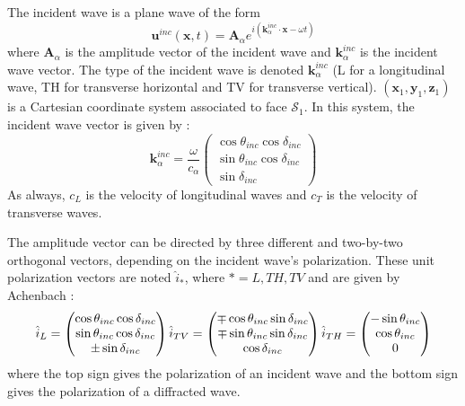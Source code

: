 The incident wave is a plane wave of the form
\begin{equation}
\mathbf{u}^{inc}(\mathbf{x},t)=\mathbf{A}_{\alpha}e^{i(\mathbf{k}_{\alpha}^{inc}\cdot \mathbf{x}-\omega t)}
\end{equation}
where $\mathbf{A}_{\alpha}$ is the amplitude vector of the incident wave and $\mathbf{k}_{\alpha}^{inc}$ is the incident wave vector. The type of the incident wave is denoted $\mathbf{k}_{\alpha}^{inc}$ (L for a longitudinal wave, TH for transverse horizontal and TV for transverse vertical). $(\mathbf{x}_1,\mathbf{y}_1, \mathbf{z}_1)$ is a Cartesian coordinate system associated to face $\mathcal{S}_1$. In this system, the incident wave vector is given by :
\begin{equation}
\mathbf{k}_{\alpha}^{inc}=\frac{\omega}{c_{\alpha}} \begin{pmatrix}
\cos\theta_{inc} \cos \delta_{inc} \\ \sin\theta_{inc} \cos \delta_{inc} \\
\sin \delta_{inc}
\end{pmatrix}
\end{equation}
As always, $c_L$ is the velocity of longitudinal waves and $c_T$ is the velocity of transverse waves.

The amplitude vector can be directed by three different and two-by-two orthogonal vectors, depending on the incident wave's polarization. These unit polarization vectors are noted $\hat{i}_*$, where $*=L, TH, TV$ and are given by Achenbach \cite{Achenbach} :
\begin{equation}
\hat{i}_L = \begin{pmatrix}
\cos\theta_{inc} \cos \delta_{inc} \\ \sin\theta_{inc} \cos \delta_{inc} \\
\pm \sin \delta_{inc}
\end{pmatrix}
\hfill
\hfill
\hat{i}_{TV} = \begin{pmatrix}
\mp\cos\theta_{inc} \sin \delta_{inc} \\ \mp\sin\theta_{inc} \sin \delta_{inc} \\
\cos \delta_{inc}
\end{pmatrix}
\hfill
\hfill
\hat{i}_{TH} = \begin{pmatrix}
-\sin\theta_{inc} \\ \cos\theta_{inc} \\
0
\end{pmatrix}
\label{ivec}
\end{equation}
where the top sign gives the polarization of an incident wave and the bottom sign gives the polarization of a diffracted wave.


